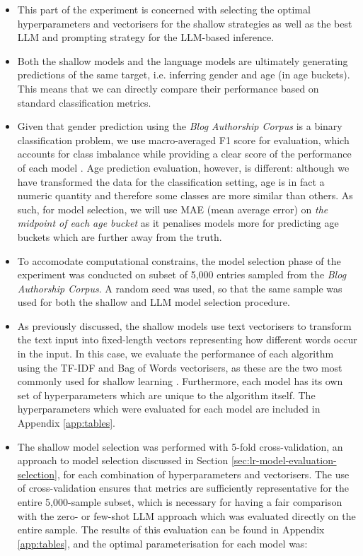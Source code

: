 \documentclass{report}
\begin{document}
\begin{itemize}
\item This part of the experiment is concerned with selecting the optimal hyperparameters and vectorisers for the shallow strategies as well as the best LLM and prompting strategy for the LLM-based inference.

\item Both the shallow models and the language models are ultimately generating predictions of the same target, i.e. inferring gender and age (in age buckets). This means that we can directly compare their performance based on standard classification metrics.

\item Given that gender prediction using the \textit{Blog Authorship Corpus} is a binary classification problem, we use macro-averaged F1 score for evaluation, which accounts for class imbalance while providing a clear score of the performance of each model . Age prediction evaluation, however, is different: although we have transformed the data for the classification setting, age is in fact a numeric quantity and therefore some classes are more similar than others. As such, for model selection, we will use MAE (mean average error) on \textit{the midpoint of each age bucket} as it penalises models more for predicting age buckets which are further away from the truth.

\item To accomodate computational constrains, the model selection phase of the experiment was conducted on subset of 5,000 entries sampled from the \textit{Blog Authorship Corpus}. A random seed was used, so that the same sample was used for both the shallow and LLM model selection procedure.

\item As previously discussed, the shallow models use text vectorisers to transform the text input into fixed-length vectors representing how different words occur in the input. In this case, we evaluate the performance of each algorithm using the TF-IDF and Bag of Words vectorisers, as these are the two most commonly used for shallow learning . Furthermore, each model has its own set of hyperparameters which are unique to the algorithm itself. The hyperparameters which were evaluated for each model are included in Appendix \ref{app:tables}.

\item The shallow model selection was performed with 5-fold cross-validation, an approach to model selection discussed in Section \ref{sec:lr-model-evaluation-selection}, for each combination of hyperparameters and vectorisers. The use of cross-validation ensures that metrics are sufficiently representative for the entire 5,000-sample subset, which is necessary for having a fair comparison with the zero- or few-shot LLM approach which was evaluated directly on the entire sample. The results of this evaluation can be found in Appendix \ref{app:tables}, and the optimal parameterisation for each model was:


\end{itemize}
\end{document}

